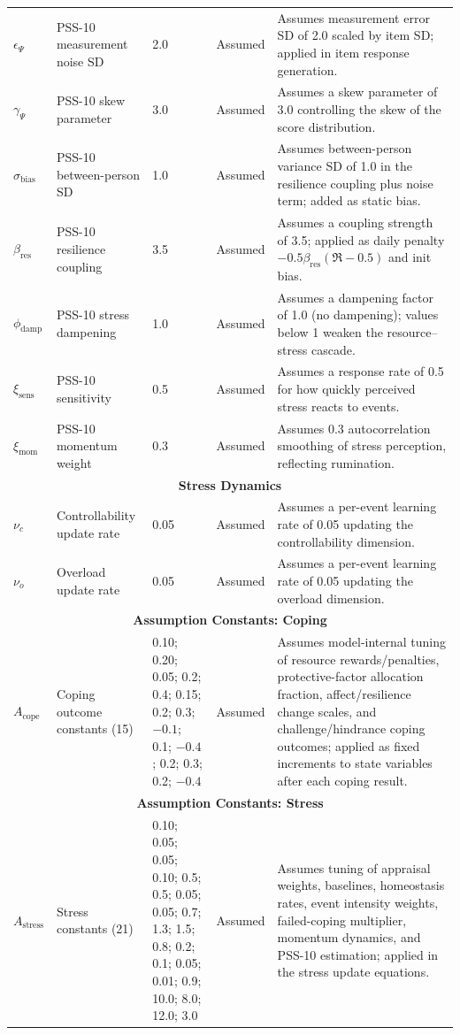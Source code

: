 \documentclass[
  letterpaper,
  DIV=11,
  numbers=noendperiod]{scrartcl}
\begin{document}
\begin{longtable}{lp{2.4cm}p{1.6cm}p{1.7cm}p{5.2cm}}
$\epsilon_{\Psi}$ & PSS-10 measurement noise SD & 2.0 & Assumed & Assumes measurement error SD of 2.0 scaled by item SD; applied in item response generation. \\
$\gamma_{\Psi}$ & PSS-10 skew parameter & 3.0 & Assumed & Assumes a skew parameter of 3.0 controlling the skew of the score distribution. \\
$\sigma_{\mathrm{bias}}$ & PSS-10 between-person SD & 1.0 & Assumed & Assumes between-person variance SD of 1.0 in the resilience coupling plus noise term; added as static bias. \\
$\beta_{\mathrm{res}}$ & PSS-10 resilience coupling & 3.5 & Assumed & Assumes a coupling strength of 3.5; applied as daily penalty $-0.5\beta_{\mathrm{res}}(\mathfrak{R} - 0.5)$ and init bias. \\
$\phi_{\mathrm{damp}}$ & PSS-10 stress dampening & 1.0 & Assumed & Assumes a dampening factor of 1.0 (no dampening); values below 1 weaken the resource--stress cascade. \\
$\xi_{\mathrm{sens}}$ & PSS-10 sensitivity & 0.5 & Assumed & Assumes a response rate of 0.5 for how quickly perceived stress reacts to events. \\
$\xi_{\mathrm{mom}}$ & PSS-10 momentum weight & 0.3 & Assumed & Assumes 0.3 autocorrelation smoothing of stress perception, reflecting rumination. \\
\midrule
\multicolumn{5}{c}{\textbf{Stress Dynamics}} \\
\midrule
$\nu_c$ & Controllability update rate & 0.05 & Assumed & Assumes a per-event learning rate of 0.05 updating the controllability dimension. \\
$\nu_o$ & Overload update rate & 0.05 & Assumed & Assumes a per-event learning rate of 0.05 updating the overload dimension. \\
\midrule
\multicolumn{5}{c}{\textbf{Assumption Constants: Coping}} \\
\midrule
$A_{\mathrm{cope}}$ & Coping outcome constants (15) & 0.10; 0.20; 0.05; 0.2; 0.4; 0.15; 0.2; 0.3; $-0.1$; 0.1; $-0.4$; 0.2; 0.3; 0.2; $-0.4$ & Assumed & Assumes model-internal tuning of resource rewards/penalties, protective-factor allocation fraction, affect/resilience change scales, and challenge/hindrance coping outcomes; applied as fixed increments to state variables after each coping result. \\
\midrule
\multicolumn{5}{c}{\textbf{Assumption Constants: Stress}} \\
\midrule
$A_{\mathrm{stress}}$ & Stress constants (21) & 0.10; 0.05; 0.05; 0.10; 0.5; 0.5; 0.05; 0.05; 0.7; 1.3; 1.5; 0.8; 0.2; 0.1; 0.05; 0.01; 0.9; 10.0; 8.0; 12.0; 3.0 & Assumed & Assumes tuning of appraisal weights, baselines, homeostasis rates, event intensity weights, failed-coping multiplier, momentum dynamics, and PSS-10 estimation; applied in the stress update equations. \\

\end{longtable}
\end{document}
